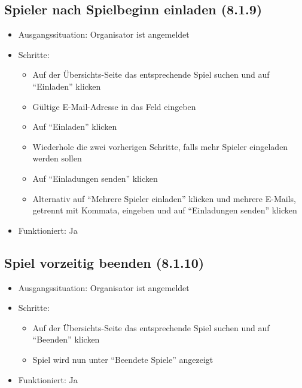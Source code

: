\documentclass[a4paper]{scrreprt}
\begin{document}
            \subsection{Spieler nach Spielbeginn einladen (8.1.9)}
            \begin{itemize}
                \item Ausgangssituation: Organisator ist angemeldet
                \item Schritte:
                    \begin{itemize}
                        \item Auf der Übersichts-Seite das entsprechende Spiel suchen und auf \enquote{Einladen} klicken
                        \item Gültige E-Mail-Adresse in das Feld eingeben
                        \item Auf \enquote{Einladen} klicken
                        \item Wiederhole die zwei vorherigen Schritte, falls mehr Spieler eingeladen werden sollen
                        \item Auf \enquote{Einladungen senden} klicken
                        \item Alternativ auf \enquote{Mehrere Spieler einladen} klicken und mehrere E-Mails, getrennt mit Kommata, eingeben und auf \enquote{Einladungen senden} klicken
                    \end{itemize}
                \item Funktioniert: Ja
            \end{itemize}

            \subsection{Spiel vorzeitig beenden (8.1.10)}
            \begin{itemize}
                \item Ausgangssituation: Organisator ist angemeldet
                \item Schritte:
                    \begin{itemize}
                        \item Auf der Übersichts-Seite das entsprechende Spiel suchen und auf \enquote{Beenden} klicken
                        \item Spiel wird nun unter \enquote{Beendete Spiele} angezeigt
                \end{itemize}
                \item Funktioniert: Ja
            \end{itemize}
\end{document}
